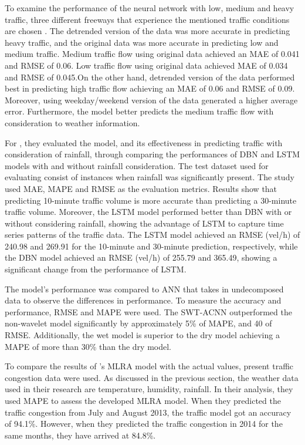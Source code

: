 To examine the performance of the neural network with low, medium and heavy traffic, three different freeways that experience the mentioned traffic conditions are chosen . The detrended version of the data was more accurate in predicting heavy traffic, and the original data was more accurate in predicting low and medium traffic. Medium traffic flow using original data achieved an MAE of 0.041 and RMSE of 0.06. Low traffic flow using original data achieved MAE of 0.034 and RMSE of 0.045.On the other hand, detrended version of the data performed best in predicting high traffic flow achieving an MAE of 0.06 and RMSE of 0.09. Moreover, using weekday/weekend version of the data generated a higher average error. Furthermore, the model better predicts the medium traffic flow with consideration to weather information.

For , they evaluated the model, and its effectiveness in predicting traffic with consideration of rainfall, through comparing the performances of DBN and LSTM models with and without rainfall consideration. The test dataset used for evaluating consist of instances when rainfall was significantly present. The study used MAE, MAPE and RMSE as the evaluation metrics. Results show that predicting 10-minute traffic volume is more accurate than predicting a 30-minute traffic volume. Moreover, the LSTM model performed better than DBN with or without considering rainfall, showing the advantage of LSTM to capture time series patterns of the traffic data. The LSTM model achieved an RMSE (vel/h) of 240.98 and  269.91 for the 10-minute and 30-minute prediction, respectively, while the DBN model achieved an RMSE (vel/h) of 255.79 and 365.49, showing a significant change from the performance of LSTM. 

The model’s performance was compared to ANN that takes in undecomposed data to observe the differences in performance. To measure the accuracy and performance, RMSE and MAPE were used. The SWT-ACNN outperformed the non-wavelet model significantly by approximately 5\% of MAPE, and 40 of RMSE. Additionally, the wet model is superior to the dry model achieving a MAPE of more than 30\% than the dry model.

To compare the results of ’s MLRA model with the actual values, present traffic congestion data were used. As discussed in the previous section, the weather data used in their research are temperature, humidity, rainfall. In their analysis, they used MAPE to assess the developed MLRA model. When they predicted the traffic congestion from July and August 2013, the traffic model got an accuracy of 94.1\%. However, when they predicted the traffic congestion in 2014 for the same months, they have arrived at 84.8\%. %




